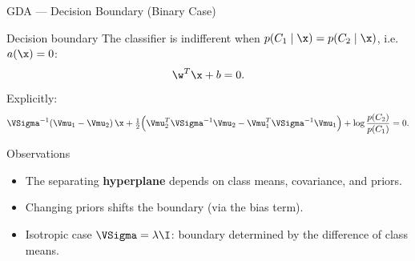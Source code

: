 \begin{frame}{GDA — Decision Boundary (Binary Case)}
  \begin{block}{Decision boundary}
    The classifier is indifferent when $p(C_1\mid\x)=p(C_2\mid\x)$, i.e.\ $a(\x)=0$:
    \[
      \w^T\x+b=0.
    \]
    Explicitly:
    \[
      \VSigma^{-1}(\Vmu_1-\Vmu_2)\,\x
      +\tfrac{1}{2}\!\left(\Vmu_2^T\VSigma^{-1}\Vmu_2-\Vmu_1^T\VSigma^{-1}\Vmu_1\right)
      +\log\frac{p(C_2)}{p(C_1)}=0.
    \]
  \end{block}

  \begin{block}{Observations}
    \begin{itemize}
      \item The separating \textbf{hyperplane} depends on class means, covariance, and priors.
      \item Changing priors shifts the boundary (via the bias term).
      \item Isotropic case $\VSigma=\lambda\I$: boundary determined by the difference of class means.
    \end{itemize}
  \end{block}
\end{frame}

